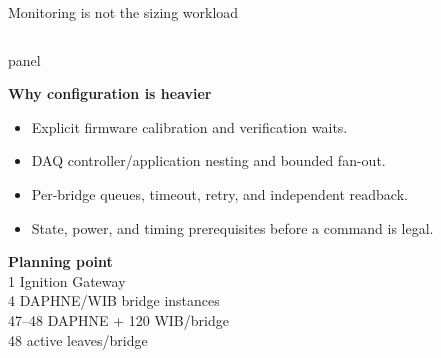 \documentclass[aspectratio=169,10pt]{beamer}
\newcommand{\tightitem}{%
  \setlength{\itemsep}{0.8mm}%
  \setlength{\parskip}{0pt}%
}
\newcommand{\fixedpanel}[4][panel]{%
  \begin{beamercolorbox}[wd=\linewidth,sep=4pt,rounded=true]{#1}
    \begin{minipage}[t][#2][t]{\dimexpr\linewidth-8pt\relax}
      \raggedright
      {\usebeamercolor[fg]{#1}\bfseries #3\par}
      \vspace{0.45mm}
      {\usebeamercolor[fg]{#1}\footnotesize #4\par}
    \end{minipage}
  \end{beamercolorbox}
}
\begin{document}
\begin{frame}[t]{Monitoring is not the sizing workload}
\begin{columns}[T,onlytextwidth]
\fixedpanel{5.2cm}{Why configuration is heavier}{
\begin{itemize}\tightitem
  \item Explicit firmware calibration and verification waits.
  \item DAQ controller/application nesting and bounded fan-out.
  \item Per-bridge queues, timeout, retry, and independent readback.
  \item State, power, and timing prerequisites before a command is legal.
\end{itemize}
\vspace{2mm}
\textcolor{noircyan}{\bfseries Planning point}\\
1 Ignition Gateway\\
4 DAPHNE/WIB bridge instances\\
47--48 DAPHNE + 120 WIB/bridge\\
48 active leaves/bridge
}
\end{columns}
\end{frame}
\end{document}
